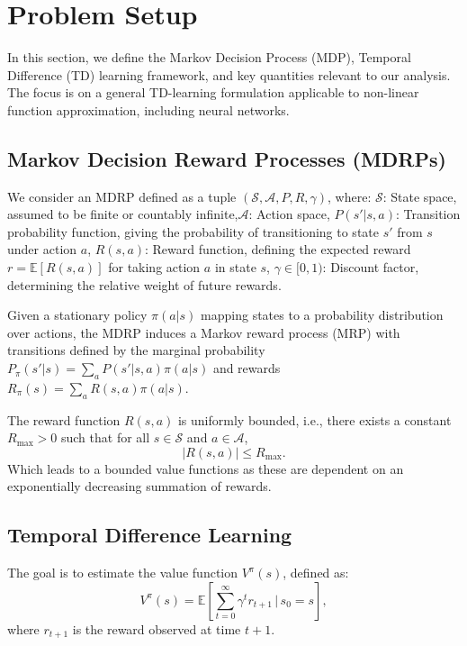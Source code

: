 \section{Problem Setup}

In this section, we define the Markov Decision Process (MDP), Temporal Difference (TD) learning framework, and key quantities relevant to our analysis. The focus is on a general TD-learning formulation applicable to non-linear function approximation, including neural networks.

\subsection{Markov Decision Reward Processes (MDRPs)}
We consider an MDRP defined as a tuple \((\mathcal{S}, \mathcal{A}, P, R, \gamma)\), where:
\(\mathcal{S}\): State space, assumed to be finite or countably infinite,\(\mathcal{A}\): Action space,
\(P(s'|s, a)\): Transition probability function, giving the probability of transitioning to state \(s'\) from \(s\) under action \(a\),
\(R(s, a)\): Reward function, defining the expected reward \(r = \mathbb{E}[R(s, a)]\) for taking action \(a\) in state \(s\),
\(\gamma \in [0, 1)\): Discount factor, determining the relative weight of future rewards.

Given a stationary policy \(\pi(a|s)\) mapping states to a probability distribution over actions, the MDRP induces a Markov reward process (MRP) with transitions defined by the marginal probability \(P_\pi(s'|s) = \sum_a P(s'|s, a)\pi(a|s)\) and rewards \(R_\pi(s) = \sum_a R(s, a)\pi(a|s)\).

\begin{assumption}
\label{ass:bounded-reward}
The reward function \(R(s, a)\) is uniformly bounded, i.e., there exists a constant \(R_{\text{max}} > 0\) such that for all \(s \in \mathcal{S}\) and \(a \in \mathcal{A}\),
\[
|R(s, a)| \leq R_{\text{max}}.
\]
Which leads to a bounded value functions as these are dependent on an exponentially decreasing summation of rewards.
\end{assumption}

\subsection{Temporal Difference Learning}
The goal is to estimate the value function \(V^\pi(s)\), defined as:
\[
V^\pi(s) = \mathbb{E}\left[ \sum_{t=0}^\infty \gamma^t r_{t+1} \,\Big|\, s_0 = s \right],
\]
where \(r_{t+1}\) is the reward observed at time \(t+1\).


